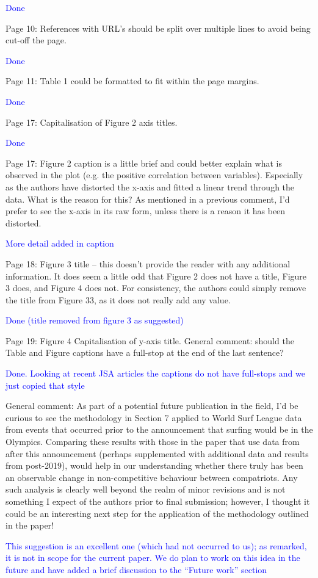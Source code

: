\documentclass[12pt]{article}
\begin{document}
\textcolor{blue}{Done}

Page 10: References with URL's should be split over multiple lines to avoid being cut-off the page.

\textcolor{blue}{Done}

Page 11: Table 1 could be formatted to fit within the page margins.

\textcolor{blue}{Done}

Page 17: Capitalisation of Figure 2 axis titles.

\textcolor{blue}{Done}

Page 17: Figure 2 caption is a little brief and could better explain
what is observed in the plot (e.g. the positive correlation between
variables). Especially as the authors have distorted the x-axis and
fitted a linear trend through the data. What is the reason for this?
As mentioned in a previous comment, I’d prefer to see the x-axis in
its raw form, unless there is a reason it has been distorted.

\textcolor{blue}{More detail added in caption}



Page 18: Figure 3 title – this doesn’t provide the reader with any
additional information. It does seem a little odd that Figure 2 does
not have a title, Figure 3 does, and Figure 4 does not. For
consistency, the authors could simply remove the title from Figure 33,
as it does not really add any value.

\textcolor{blue}{Done (title removed from figure 3 as suggested)}

Page 19: Figure 4 Capitalisation of y-axis title.  General comment:
should the Table and Figure captions have a full-stop at the end of
the last sentence?

\textcolor{blue}{Done.  Looking at recent JSA articles the captions do
  not have full-stops and we just copied that style}


General comment: As part of a potential future publication in the
field, I'd be curious to see the methodology in Section 7 applied to
World Surf League data from events that occurred prior to the
announcement that surfing would be in the Olympics.  Comparing these
results with those in the paper that use data from after this
announcement (perhaps supplemented with additional data and results
from post-2019), would help in our understanding whether there truly
has been an observable change in non-competitive behaviour between
compatriots.  Any such analysis is clearly well beyond the realm of
minor revisions and is not something I expect of the authors prior to
final submission; however, I thought it could be an interesting next
step for the application of the methodology outlined in the paper!

\textcolor{blue}{This suggestion is an excellent one (which had not
  occurred to us); as remarked, it is not in scope for the current
  paper.  We do plan to work on this idea in the future and have added
  a brief discussion to the ``Future work'' section
}
\end{document}
